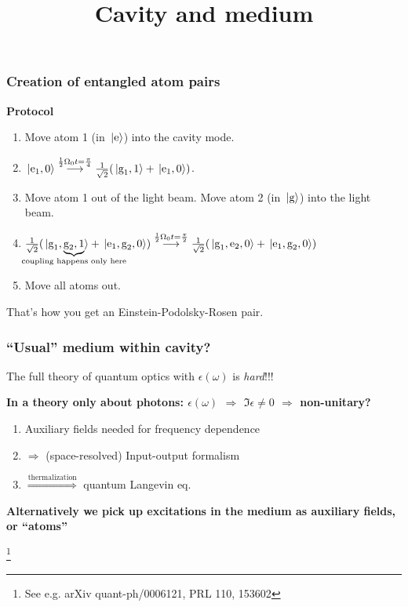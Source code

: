 \documentclass[t]{beamer}
\newcommand\blfootnote[1]{%
\begingroup
\renewcommand\thefootnote{}\footnote{#1}%
\addtocounter{footnote}{-1}%
\endgroup
}
\begin{document}
\begin{frame}
\frametitle{Creation of entangled atom pairs}

\textbf{Protocol}
\begin{enumerate}
    \item Move atom 1 (in $\ket*{\text{e}}$) into the cavity mode. 
    \item $\ket*{\text{e}_1, 0} \stackrel{\frac{1}{2} \Omega_0 t = \frac{\pi}{4}}{\longrightarrow} \frac{1}{\sqrt{2}} (\ket*{\text{g}_1, 1} + \ket*{\text{e}_1, 0})$.
    \item Move atom 1 out of the light beam. Move atom 2 (in $\ket*{\text{g}}$) into the light beam.
    \item $\frac{1}{\sqrt{2}} (\ket*{\text{g}_1, \underbrace{\text{g}_2, 1}_{\mathclap{\text{coupling happens only here}}}} + \ket*{\text{e}_1, \text{g}_2, 0}) 
    \stackrel{\frac{1}{2} \Omega_0 t = \frac{\pi}{2}}{\longrightarrow} 
    \frac{1}{\sqrt{2}} (\ket*{\text{g}_1, \text{e}_2, 0} + \ket*{\text{e}_1, \text{g}_2, 0})$
    \item Move all atoms out. 
\end{enumerate}

That's how you get an Einstein-Podolsky-Rosen pair.

\end{frame}

\title{Cavity and medium}
\author{}
\date{}

\begin{frame}
    \titlepage
\end{frame}

\begin{frame}
\frametitle{``Usual'' medium within cavity?}

The full theory of quantum optics with $\epsilon(\omega)$ is \emph{hard}!!!

\textbf{In a theory only about photons: $\epsilon(\omega)$ $\Rightarrow$ $\Im \epsilon \neq 0$ $\Rightarrow$ non-unitary?}

\begin{enumerate}
    \item Auxiliary fields needed for frequency dependence
    \item $\Rightarrow$ (space-resolved) Input-output formalism
    \item $\stackrel{\text{thermalization}}{\Rightarrow}$ quantum Langevin eq.
\end{enumerate}

\vspace{0.4cm}

\textbf{Alternatively we pick up excitations in the medium as auxiliary fields, or ``atoms''}

\blfootnote{See e.g. arXiv quant-ph/0006121, PRL 110, 153602}

\end{frame}
\end{document}
